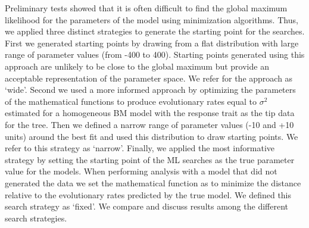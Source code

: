 Preliminary tests showed that it is often difficult to find the global maximum likelihood for the parameters of the model using minimization algorithms. Thus, we applied three distinct strategies to generate the starting point for the searches. First we generated starting points by drawing from a flat distribution with large range of parameter values (from -400 to 400). Starting points generated using this approach are unlikely to be close to the global maximum but provide an acceptable representation of the parameter space. We refer for the approach as `wide'. Second we used a more informed approach by optimizing the parameters of the mathematical functions to produce evolutionary rates equal to $\sigma^{2}$ estimated for a homogeneous BM model with the response trait as the tip data for the tree. Then we defined a narrow range of parameter values (-10 and +10 units) around the best fit and used this distribution to draw starting points. We refer to this strategy as `narrow'. Finally, we applied the most informative strategy by setting the starting point of the ML searches as the true parameter value for the models. When performing analysis with a model that did not generated the data we set the mathematical function as to minimize the distance relative to the evolutionary rates predicted by the true model. We defined this search strategy as `fixed'. We compare and discuss results among the different search strategies.




